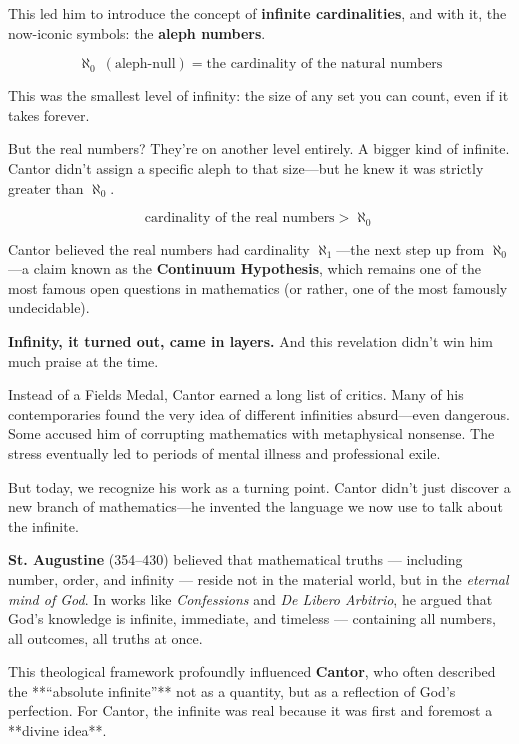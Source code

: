 This led him to introduce the concept of \textbf{infinite cardinalities}, and with it, the now-iconic symbols: the \textbf{aleph numbers}.

\[
\aleph_0\ (\text{aleph-null}) = \text{the cardinality of the natural numbers}
\]

This was the smallest level of infinity: the size of any set you can count, even if it takes forever.

But the real numbers? They’re on another level entirely. A bigger kind of infinite. Cantor didn’t assign a specific aleph to that size—but he knew it was strictly greater than $\aleph_0$.

\[
\text{cardinality of the real numbers} > \aleph_0
\]

Cantor believed the real numbers had cardinality $\aleph_1$—the next step up from $\aleph_0$—a claim known as the \textbf{Continuum Hypothesis}, which remains one of the most famous open questions in mathematics (or rather, one of the most famously undecidable).





\textbf{Infinity, it turned out, came in layers.} And this revelation didn’t win him much praise at the time.





Instead of a Fields Medal, Cantor earned a long list of critics. Many of his contemporaries found the very idea of different infinities absurd—even dangerous. Some accused him of corrupting mathematics with metaphysical nonsense. The stress eventually led to periods of mental illness and professional exile.

But today, we recognize his work as a turning point. Cantor didn’t just discover a new branch of mathematics—he invented the language we now use to talk about the infinite.


\begin{tcolorbox}[colback=gray!5!white, colframe=black!80!white, title={Historical Sidenote: Augustine and the Eternal Infinite}]

  \textbf{St. Augustine} (354–430) believed that mathematical truths — including number, order, and infinity — reside not in the material world, but in the \textit{eternal mind of God}. In works like \textit{Confessions} and \textit{De Libero Arbitrio}, he argued that God’s knowledge is infinite, immediate, and timeless — containing all numbers, all outcomes, all truths at once.
  
  \medskip
  
  This theological framework profoundly influenced \textbf{Cantor}, who often described the **“absolute infinite”** not as a quantity, but as a reflection of God’s perfection. For Cantor, the infinite was real because it was first and foremost a **divine idea**.
  
\end{tcolorbox}





